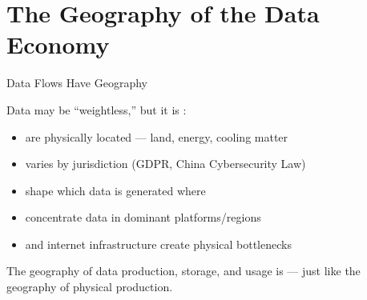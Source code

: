 \documentclass{beamer}
\begin{document}

\section{The Geography of the Data Economy}

\begin{frame}{Data Flows Have Geography}

    Data may be ``weightless,'' but it is :

    \vspace{0.5em}
    \begin{itemize}
        \item {} are physically located --- land, energy, cooling matter
        \item {} varies by jurisdiction (GDPR, China Cybersecurity Law)
        \item {} shape which data is generated where
        \item {} concentrate data in dominant platforms/regions
        \item {} and internet infrastructure create physical bottlenecks
    \end{itemize}

    \vspace{0.5em}
    The geography of data production, storage, and usage is  --- just like the geography of physical production.

\end{frame}
\end{document}

